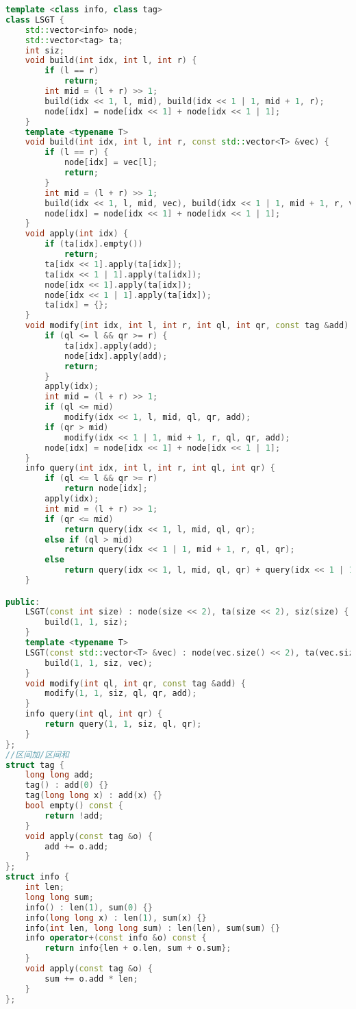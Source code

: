 \begin{lstlisting}[language=C++]
template <class info, class tag>
class LSGT {
    std::vector<info> node;
    std::vector<tag> ta;
    int siz;
    void build(int idx, int l, int r) {
        if (l == r)
            return;
        int mid = (l + r) >> 1;
        build(idx << 1, l, mid), build(idx << 1 | 1, mid + 1, r);
        node[idx] = node[idx << 1] + node[idx << 1 | 1];
    }
    template <typename T>
    void build(int idx, int l, int r, const std::vector<T> &vec) {
        if (l == r) {
            node[idx] = vec[l];
            return;
        }
        int mid = (l + r) >> 1;
        build(idx << 1, l, mid, vec), build(idx << 1 | 1, mid + 1, r, vec);
        node[idx] = node[idx << 1] + node[idx << 1 | 1];
    }
    void apply(int idx) {
        if (ta[idx].empty())
            return;
        ta[idx << 1].apply(ta[idx]);
        ta[idx << 1 | 1].apply(ta[idx]);
        node[idx << 1].apply(ta[idx]);
        node[idx << 1 | 1].apply(ta[idx]);
        ta[idx] = {};
    }
    void modify(int idx, int l, int r, int ql, int qr, const tag &add) {
        if (ql <= l && qr >= r) {
            ta[idx].apply(add);
            node[idx].apply(add);
            return;
        }
        apply(idx);
        int mid = (l + r) >> 1;
        if (ql <= mid)
            modify(idx << 1, l, mid, ql, qr, add);
        if (qr > mid)
            modify(idx << 1 | 1, mid + 1, r, ql, qr, add);
        node[idx] = node[idx << 1] + node[idx << 1 | 1];
    }
    info query(int idx, int l, int r, int ql, int qr) {
        if (ql <= l && qr >= r)
            return node[idx];
        apply(idx);
        int mid = (l + r) >> 1;
        if (qr <= mid)
            return query(idx << 1, l, mid, ql, qr);
        else if (ql > mid)
            return query(idx << 1 | 1, mid + 1, r, ql, qr);
        else
            return query(idx << 1, l, mid, ql, qr) + query(idx << 1 | 1, mid + 1, r, ql, qr);
    }

public:
    LSGT(const int size) : node(size << 2), ta(size << 2), siz(size) {
        build(1, 1, siz);
    }
    template <typename T>
    LSGT(const std::vector<T> &vec) : node(vec.size() << 2), ta(vec.size() << 2), siz(vec.size() - 1) {
        build(1, 1, siz, vec);
    }
    void modify(int ql, int qr, const tag &add) {
        modify(1, 1, siz, ql, qr, add);
    }
    info query(int ql, int qr) {
        return query(1, 1, siz, ql, qr);
    }
};
//区间加/区间和
struct tag {
    long long add;
    tag() : add(0) {}
    tag(long long x) : add(x) {}
    bool empty() const {
        return !add;
    }
    void apply(const tag &o) {
        add += o.add;
    }
};
struct info {
    int len;
    long long sum;
    info() : len(1), sum(0) {}
    info(long long x) : len(1), sum(x) {}
    info(int len, long long sum) : len(len), sum(sum) {}
    info operator+(const info &o) const {
        return info{len + o.len, sum + o.sum};
    }
    void apply(const tag &o) {
        sum += o.add * len;
    }
};


\end{lstlisting}
